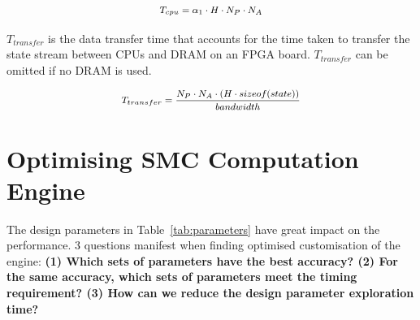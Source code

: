 \begin{equation}
\footnotesize
\begin{aligned}
T_{cpu} = \alpha_1 \cdot H \cdot N_P \cdot N_A
\end{aligned}
\end{equation}

$T_{transfer}$ is the data transfer time that accounts for the time taken to transfer the state stream between CPUs and DRAM on an FPGA board.
$T_{transfer}$ can be omitted if no DRAM is used.

\begin{equation}
\footnotesize
\begin{aligned}
T_{transfer} = \frac{N_P \cdot N_A \cdot \left ( H \cdot sizeof(state)\right)}{bandwidth}
\end{aligned}
\end{equation}




\section{Optimising SMC Computation Engine}
\label{sec:optimisation}

The design parameters in Table~\ref{tab:parameters} have great impact on the performance.
3 questions manifest when finding optimised customisation of the engine:
\textbf{(1) Which sets of parameters have the best accuracy?
(2) For the same accuracy, which sets of parameters meet the timing requirement?
(3) How can we reduce the design parameter exploration time?}

